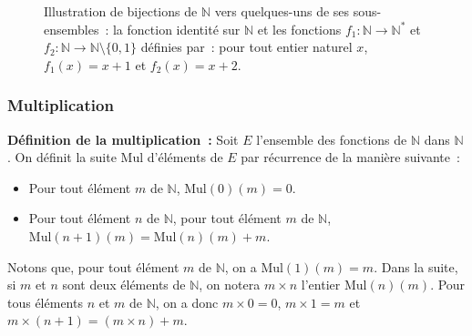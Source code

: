 \begin{figure}
\centering
{}
\caption{Illustration de bijections de $\mathbb{N}$ vers quelques-uns de ses sous-ensembles : la fonction identité sur $\mathbb{N}$ et les fonctions $f_1: \mathbb{N} \to \mathbb{N^*}$ et $f_2: \mathbb{N} \to \mathbb{N} \setminus \lbrace 0, 1 \rbrace$ définies par : pour tout entier naturel $x$, $f_1(x) = x + 1$ et $f_2(x) = x + 2$.}
\label{fig:bij_N_N2}
\end{figure}

\subsubsection{Multiplication}
\label{subsub:multiplication}

\noindent\textbf{Définition de la multiplication :} Soit $E$ l'ensemble des fonctions de $\mathbb{N}$ dans $\mathbb{N}$. 
    On définit la suite $\mathrm{Mul}$ d'éléments de $E$ par récurrence de la manière suivante : 
    \begin{itemize}[nosep]
        \item Pour tout élément $m$ de $\mathbb{N}$, $\mathrm{Mul}(0)(m) = 0$.
        \item Pour tout élément $n$ de $\mathbb{N}$, pour tout élément $m$ de $\mathbb{N}$, $\mathrm{Mul}(n+1)(m) = \mathrm{Mul}(n)(m) + m$.
    \end{itemize}
    Notons que, pour tout élément $m$ de $\mathbb{N}$, on a $\mathrm{Mul}(1)(m) = m$. 
    Dans la suite, si $m$ et $n$ sont deux éléments de $\mathbb{N}$, on notera $m \times n$ l'entier $\mathrm{Mul}(n)(m)$. 
    Pour tous éléments $n$ et $m$ de $\mathbb{N}$, on a donc $m \times 0 = 0$, $m \times 1 = m$ et $m \times (n+1) = (m \times n) + m$.
    
